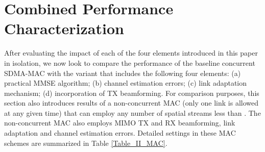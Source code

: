 \documentclass[journal, final]{IEEEtran}
\begin{document}
\section{Combined Performance Characterization}

After evaluating the impact of each of the four elements introduced in this
paper in isolation, we now look to compare the performance of the baseline
concurrent SDMA-MAC with the variant that includes the following four
elements: (a) practical MMSE algorithm; (b) channel estimation errors; (c) link
adaptation mechanism; (d) incorporation of TX beamforming. For comparison
purposes, this section also introduces results of a non-concurrent MAC (only one link is allowed at any given time) that can employ any number of spatial streams less than . The non-concurrent MAC also employs  MIMO TX and RX beamforming, link adaptation and channel estimation
errors. Detailed settings in these MAC schemes are summarized in Table \ref{Table_II_MAC}.
\end{document}
